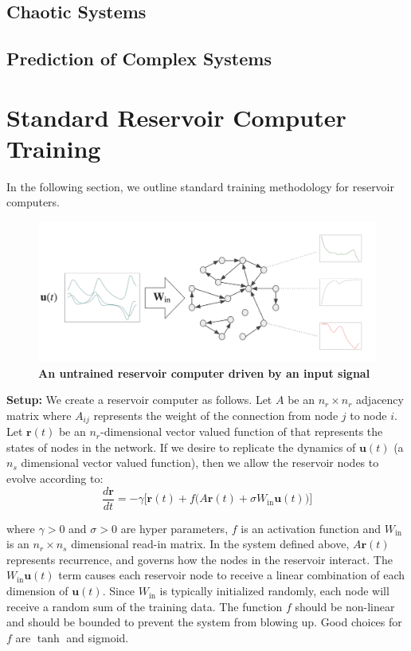 \documentclass[journal]{journal}
\begin{document}

\subsection{Chaotic Systems}

\subsection{Prediction of Complex Systems}

\section{Standard Reservoir Computer Training}
In the following section, we outline standard training methodology for reservoir computers.
\begin{figure}[h]
\centering
\includegraphics[scale=0.4]{Images/driven_rc_noeqs.png}
\caption{\textbf{An untrained reservoir computer driven by an input signal}}
\end{figure}


\textbf{Setup:} We create a reservoir computer as follows. 
 Let $A$ be an $n_r \times n_r$ adjacency matrix where $A_{ij}$ represents the weight of the connection from node $j$ to node $i$. 
 Let $\mathbf{r}(t)$ be an $n_r$-dimensional vector valued function of that represents the states of nodes in the network. 
 If we desire to replicate the dynamics of $\mathbf{u}(t)$ (a $n_s$ dimensional vector valued function), then we allow the reservoir nodes to evolve according to:
\begin{equation} \label{untrained}
\frac{d\mathbf{r}}{dt} = -\gamma\big[\mathbf{r}(t) + f\big(A\mathbf{r}(t) + \sigma W_\text{in} \mathbf{u}(t)\big)\big]
\end{equation}

where $\gamma > 0$ and $\sigma > 0$ are hyper parameters, $f$ is an activation function and $W_\text{in}$ is an $n_r \times n_s$ dimensional read-in matrix. In the system defined above, $A\mathbf{r}(t)$ represents recurrence, and governs how the nodes in the reservoir interact. The $W_\text{in}\mathbf{u}(t)$ term causes each reservoir node to receive a linear combination of each dimension of $\mathbf{u}(t)$.  Since $W_\text{in}$ is typically initialized randomly, each node will receive a random sum of the training data. The function $f$ should be non-linear and should be bounded to prevent the system from blowing up. Good choices for $f$ are $\tanh$ and sigmoid.
\end{document}
